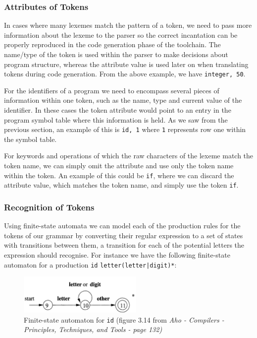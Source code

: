 \documentclass[a4paper, 11pt]{article}
\begin{document}
\subsubsection{Attributes of Tokens}
In cases where many lexemes match the pattern of a token, we need to pass more information about the lexeme to the parser so the correct incantation can be properly reproduced in the code generation phase of the toolchain. The name/type of the token is used within the parser to make decisions about program structure, whereas the attribute value is used later on when translating tokens during code generation. From the above example, we have \textlangle{}\texttt{integer, 50}\textrangle{}.

For the identifiers of a program we need to encompass several pieces of information within one token, such as the name, type and current value of the identifier. In these cases the token attribute would point to an entry in the program symbol table where this information is held. As we saw from the previous section, an example of this is \textlangle{}\texttt{id, 1}\textrangle{} where \texttt{1} represents row one within the symbol table.

For keywords and operations of which the raw characters of the lexeme match the token name, we can simply omit the attribute and use only the token name within the token. An example of this could be \texttt{if}, where we can discard the attribute value, which matches the token name, and simply use the token \textlangle{}\texttt{if}\textrangle{}.

\subsubsection{Recognition of Tokens}
Using finite-state automata we can model each of the production rules for the tokens of our grammar by converting their regular expression to a set of states with transitions between them, a transition for each of the potential letters the expression should recognise. For instance we have the following finite-state automaton for a production \texttt{id} \textbf{\textrightarrow} \texttt{letter(letter|digit)*}:

\begin{figure}[H]
	\centering
	\includegraphics[width=60mm]{resource/FA.png}
	\caption{Finite-state automaton for \texttt{id} (figure 3.14 from \textit{Aho - Compilers - Principles, Techniques, and Tools - page 132)} \label{overflow}}
\end{figure}
\end{document}
